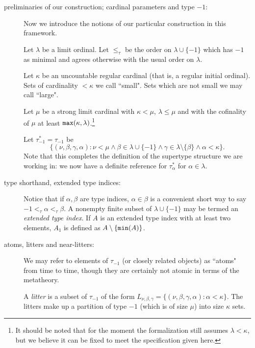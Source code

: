 \documentclass[112pt]{article}
\begin{document}
\begin{description}


\item[preliminaries of our construction;  cardinal parameters and type $-1$:]Now we introduce the notions of our particular construction in this framework.

Let $\lambda$ be a limit ordinal.  Let $\leq_\tau$ be the order on $\lambda \cup \{-1\}$ which has $-1$ as minimal and agrees otherwise with the usual order on $\lambda$.

Let $\kappa$ be an uncountable regular cardinal (that is, a regular initial ordinal).  Sets of cardinality $<\kappa$ we call ``small".  Sets which are not small we may call ``large".

Let $\mu$ be a strong limit cardinal with $\kappa<\mu$, $\lambda \leq \mu$ and with the cofinality of $\mu$ at least ${\tt max}(\kappa,\lambda)$.\footnote{It should be noted that for the moment the formalization still assumes $\lambda<\kappa$, but we believe it can be fixed to meet the specification given here.}

Let $\tau^*_{-1}=\tau_{-1}$ be $$\{(\nu,\beta,\gamma,\alpha):\nu<\mu \wedge  \beta \in \lambda\cup \{-1\} \wedge \gamma \in \lambda \setminus \{\beta\}\wedge \alpha<\kappa\}.$$  Note that this completes the definition of the supertype structure we are working in:  we now have a definite reference
for $\tau^*_\alpha$ for $\alpha\in \lambda$.





\item[type shorthand, extended type indices:]  Notice that if $\alpha,\beta$ are type indices, $\alpha\in \beta$ is a convenient short way to say $-1 <_\tau \alpha <_\tau \beta$.   A nonempty finite subset of $\lambda \cup \{-1\}$ may be termed an {\em extended type index}.  If $A$ is an extended type index with at least two elements, $A_1$ is defined as $A \setminus \{{\tt min}(A)\}$.

\item[atoms, litters and near-litters:]  

We may refer to elements of $\tau_{-1}$ (or closely related objects) as ``atoms" from time to time, though they are certainly not atomic in terms of the metatheory.

A {\em litter\/} is a subset of $\tau_{-1}$ of the form $L_{\nu,\beta,\gamma} = \{(\nu,\beta,\gamma,\alpha):\alpha<\kappa\}$.  The litters make up a partition of type $-1$
(which is of size $\mu$) into size $\kappa$ sets.


\end{description}
\end{document}
